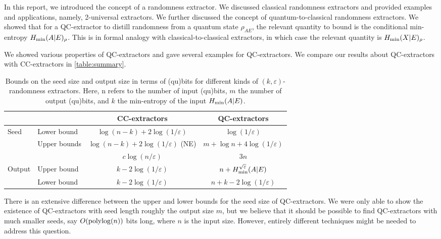
In this report, we introduced the concept of a randomness extractor. We discussed classical randomness extractors and provided examples and applications, namely, 2-universal extractors. We further discussed the concept of quantum-to-classical randomness extractors. We showed that for a QC-extractor to distill randomness from a quantum state $\rho_{AE}$, the relevant quantity to bound is the conditional min-entropy $H_{{\min}}(A | E)_{\rho}$. This is in formal analogy with classical-to-classical extractors, in which case the relevant quantity is $H_{{\min}}(X | E)_{\rho}$.

We showed various properties of QC-extractors and gave several examples for QC-extractors. We compare our results about QC-extractors with CC-extractors in \autoref{table:summary}.

\begin{table}[h]
    \centering
    \begin{tabular}{|l|l|c|c|}
    \hline
        & & CC-extractors & QC-extractors \\\hline 
        Seed & Lower bound & $\log(n - k) + 2 \log(1 / \varepsilon)$ & $\log(1 / \varepsilon)$ \\
        & Upper bounds & $\log(n - k) + 2 \log(1 / \varepsilon)$ (NE) & $m + \log n + 4 \log(1 / \varepsilon)$ \\
        & & $c \log(n / \varepsilon)$ & $3 n$ \\\hline 
        Output & Upper bound & $k - 2 \log(1 / \varepsilon)$ & $n + H_{{\min}}^{\sqrt{\varepsilon}}(A | E)$ \\
        & Lower bound & $k - 2 \log(1 / \varepsilon)$ & $n + k - 2 \log(1 / \varepsilon)$ \\\hline
    \end{tabular}
    \vspace{5pt}
    \caption{Bounds on the seed size and output size in terms of (qu)bits for different kinds of $(k, \varepsilon)$-randomness extractors. Here, n refers to the number of input (qu)bits, $m$ the number of output (qu)bits, and $k$ the min-entropy of the input $H_{{\min}}(A | E)$.}
    \label{table:summary}
\end{table}

There is an extensive difference between the upper and lower bounds for the seed size of QC-extractors. We were only able to show the existence of QC-extractors with seed length roughly the output size $m$, but we believe that it should be possible to find QC-extractors with much smaller seeds, say $O({\rm polylog}(n))$ bits long, where $n$ is the input size. However, entirely different techniques might be needed to address this question.

